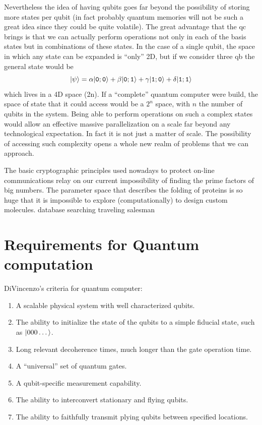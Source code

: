 Nevertheless the idea of having qubits goes far beyond the possibility of storing more states per qubit (in fact probably quantum memories will not be such a great idea since they could be quite volatile).
The great advantage that the \ac{qc} brings is that we can actually perform operations not only in each of the basis states but in combinations of these states\cite{DiVincenzo2000}. In the case of a single qubit, the space in which any state can be expanded is ``only'' 2D, but if we consider three \ac{qb} the general state would be
\begin{equation}
  |\psi\rangle = \alpha|\texttt{0};\texttt{0}\rangle + \beta|\texttt{0};\texttt{1}\rangle +
               \gamma|\texttt{1};\texttt{0}\rangle + \delta|\texttt{1};\texttt{1}\rangle
\end{equation}
which lives in a 4D space (2n).
If a ``complete'' quantum computer were build, the space of state that it could access would be a $2^n$ space, with $n$ the number of qubits in the system. Being able to perform operations on such a complex states would allow an effective massive parallelization on a scale far beyond any technological expectation.
In fact it is not just a matter of scale. The possibility of accessing such complexity opens a whole new realm of problems that we can approach.

The basic cryptographic principles used nowadays to protect on-line communications relay on our current impossibility of finding the prime factors of big numbers\cite{Shor1994}.
The parameter space that describes the folding of proteins is so huge that it is impossible to explore (computationally) to design custom molecules.\cite{Lanyon2009}
database searching\cite{Grover1997}
traveling salesman\cite{Goswami2004, Moylett2017}


\section{Requirements for Quantum computation}

DiVincenzo's criteria for quantum computer\cite{DiVincenzo2000}:
\begin{enumerate}
  \item A scalable physical system with well characterized qubits.
  \item The ability to initialize the state of the qubits to a simple fiducial state, such as $|000\dots\rangle$.
  \item Long relevant decoherence times, much longer than the gate operation time.
  \item A ``universal'' set of quantum gates.
  \item A qubit-specific measurement capability.
  \item The ability to interconvert stationary and flying qubits.
  \item The ability to faithfully transmit plying qubits between specified locations.
\end{enumerate}





